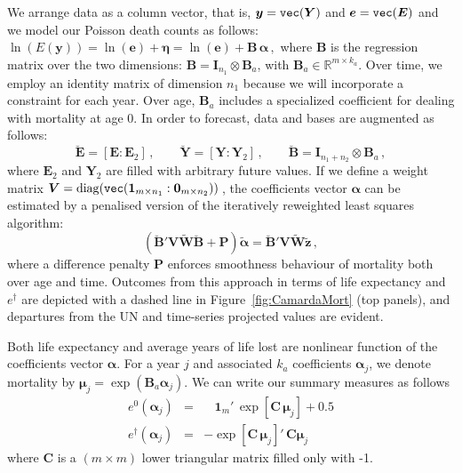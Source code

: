 \documentclass[12pt,a4paper,twoside]{article}
\begin{document}
We arrange data as a column vector, that is, $\bm{y} = \verb"vec"(\bm{Y})$ and $\bm{e} = \verb"vec"(\bm{E})$ and we model our Poisson death counts as follows: $\ln(E(\bm{y})) = \ln(\bm{e})+ \bm{\eta} = \ln(\bm{e})+ \bm{B}\,\bm{\alpha}\, , $ where $\bm{B}$ is the regression matrix over the two dimensions: $\bm{B} = \bm{I}_{n_{1}} \otimes \bm{B}_{a}$, with $\bm{B}_{a} \in \mathbb{R}^{m \times k_{a}}$. Over time, we employ an identity matrix of dimension $n_{1}$ because we will incorporate a constraint for each year. Over age, $\bm{B}_{a}$ includes a specialized coefficient for dealing with mortality at age 0. In order to forecast, data and bases are augmented as follows:
\begin{equation}\label{eq:AugData}
\breve{\bm{E}} = [\bm{E} : \bm{E}_{2}]\, , \qquad 
\breve{\bm{Y}} = [\bm{Y} : \bm{Y}_{2}]\, , \qquad
\breve{\bm{B}} = \bm{I}_{n_{1}+n_{2}} \otimes \bm{B}_{a}
\, ,
\end{equation}
where $\bm{E}_{2}$ and $\bm{Y}_{2}$ are filled with arbitrary future values. If we define a weight matrix $\bm{V} = \mathrm{diag}(\verb"vec"(\bm{1}_{m\times n_{1}}:\bm{0}_{m\times n_{2}}))\,$, the coefficients vector $\bm{\alpha}$
can be estimated by a penalised version of the iteratively reweighted least squares algorithm: 
\begin{equation}\label{eq:penIRWLSfor}
(\breve{\bm{B}}' \bm{V} \tilde{\bm{W}} \breve{\bm{B}} + \bm{P}) \tilde{\bm{\alpha}} =
\breve{\bm{B}}'\bm{V} \tilde{\bm{W}}\tilde{\bm{z}} \, ,
\end{equation} 	
where a difference penalty $\bm{P}$ enforces smoothness behaviour of mortality both over age and time. Outcomes from this approach in terms of life expectancy and $e^{\dagger}$ are depicted with a dashed line in Figure~\ref{fig:CamardaMort} (top panels), and departures from the UN and time-series projected values are evident. 

Both life expectancy and average years of life lost are nonlinear function of the coefficients vector $\bm{\alpha}$. For a year $j$ and associated $k_{a}$ coefficients $\bm{\alpha}_{j}$, we denote mortality by $\bm{\mu}_{j} = \exp(\bm{B}_{a}\bm{\alpha}_{j})$. We can write our summary measures as follows
\begin{eqnarray}\label{eq:e0ed}
e^{0} (\bm{\alpha}_{j}) &=& \;\;\,\,\bm{1}_{m}' \, \exp[ \bm{C} \, \bm{\mu}_{j}]  + 0.5 \\
e^{\dagger} (\bm{\alpha}_{j}) &=&  - \exp[ \bm{C} \, \bm{\mu}_{j}]' \, \bm{C} \bm{\mu}_{j} \nonumber
\end{eqnarray} 
where $\bm{C}$ is a $(m \times m)$ lower triangular matrix filled only with -1. 
\end{document}
